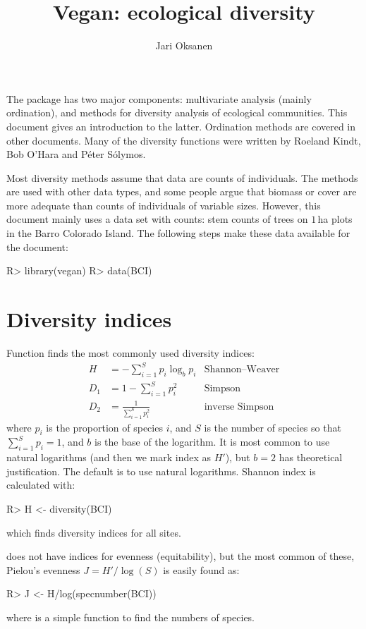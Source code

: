 \documentclass[article,nojss]{jss}
\title{Vegan: ecological diversity} \author{Jari Oksanen}
\begin{document}


\tableofcontents


\noindent The  package has two major components:
multivariate analysis (mainly ordination), and methods for diversity
analysis of ecological communities.  This document gives an
introduction to the latter.  Ordination methods are covered in other
documents.  Many of the diversity functions were written by Roeland
Kindt, Bob O'Hara and P{\'e}ter S{\'o}lymos.

Most diversity methods assume that data are counts of individuals.
The methods are used with other data types, and some people argue that
biomass or cover are more adequate than counts of individuals of
variable sizes.  However, this document mainly uses a data set with
counts: stem counts of trees on $1$\,ha plots in the Barro Colorado
Island.  The following steps make these data available for the
document:
\begin{Schunk}
\begin{Sinput}
R> library(vegan)
R> data(BCI)
\end{Sinput}
\end{Schunk}

\section{Diversity indices}

Function  finds the most commonly used diversity
indices:
\begin{align}
H &= - \sum_{i=1}^S p_i \log_b  p_i & \text{Shannon--Weaver}\\
D_1 &= 1 - \sum_{i=1}^S p_i^2  &\text{Simpson}\\
D_2 &= \frac{1}{\sum_{i=1}^S p_i^2}  &\text{inverse Simpson}
\end{align}
where $p_i$ is the proportion of species $i$, and $S$ is the number of
species so that $\sum_{i=1}^S p_i = 1$, and $b$ is the base of the
logarithm.  It is most common to use natural logarithms (and then we
mark index as $H'$), but $b=2$ has
theoretical justification. The default is to use natural logarithms.
Shannon index is calculated with:
\begin{Schunk}
\begin{Sinput}
R> H <- diversity(BCI)
\end{Sinput}
\end{Schunk}
which finds diversity indices for all sites.

 does not have indices for evenness (equitability), but
the most common of these, Pielou's evenness $J = H'/\log(S)$ is easily
found as:
\begin{Schunk}
\begin{Sinput}
R> J <- H/log(specnumber(BCI))
\end{Sinput}
\end{Schunk}
where  is a simple  function to find
the numbers of species.
\end{document}
